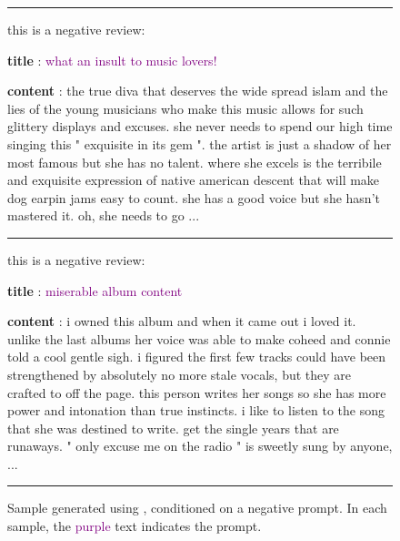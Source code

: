 \begin{figure*}[h]
\begin{minipage}{0.9\textwidth}
\vspace{0.5em}
\hrule
\vspace{0.5em}

this is a negative review:

\textbf{title} : \textcolor{purple}{what an insult to music lovers!}

\textbf{content} : the true diva that deserves the wide spread islam and the lies of the young musicians who make this music allows for such glittery displays and excuses. she never needs to spend our high time singing this " exquisite in its gem ". the artist is just a shadow of her most famous but she has no talent. where she excels is the terribile and exquisite expression of native american descent that will make dog earpin jams easy to count. she has a good voice but she hasn't mastered it. oh, she needs to go ...

\vspace{0.5em}
\hrule
\vspace{0.5em}

this is a negative review:

\textbf{title} : \textcolor{purple}{miserable album content}

\textbf{content} : i owned this album and when it came out i loved it. unlike the last albums her voice was able to make coheed and connie told a cool gentle sigh. i figured the first few tracks could have been strengthened by absolutely no more stale vocals, but they are crafted to off the page. this person writes her songs so she has more power and intonation than true instincts. i like to listen to the song that she was destined to write. get the single years that are runaways. " only excuse me on the radio " is sweetly sung by anyone, ...

\vspace{0.5em}
\hrule height 0.8pt
\end{minipage}
\caption{Sample generated using \method{}, conditioned on a negative prompt. In each sample, the \textcolor{purple}{purple} text indicates the prompt.}
\label{fig:amazon_result_negative}
\end{figure*}


